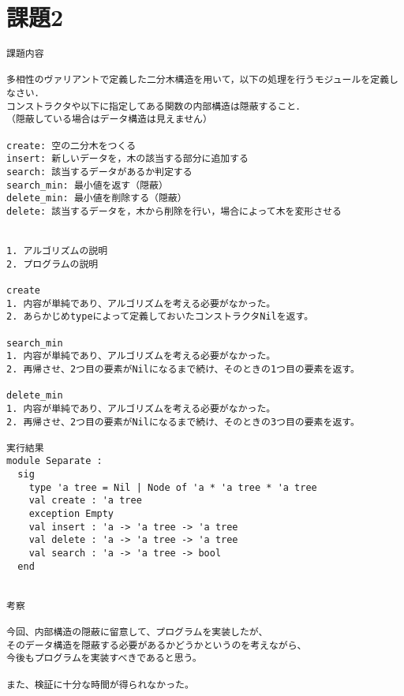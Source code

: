 \documentclass{jarticle}
\begin{document}
\newpage
\section{課題2}
\begin{verbatim}
課題内容

多相性のヴァリアントで定義した二分木構造を用いて，以下の処理を行うモジュールを定義しなさい．
コンストラクタや以下に指定してある関数の内部構造は隠蔽すること．
（隠蔽している場合はデータ構造は見えません）

create: 空の二分木をつくる
insert: 新しいデータを，木の該当する部分に追加する
search: 該当するデータがあるか判定する
search_min: 最小値を返す（隠蔽）
delete_min: 最小値を削除する（隠蔽）
delete: 該当するデータを，木から削除を行い，場合によって木を変形させる


1. アルゴリズムの説明
2. プログラムの説明

create
1. 内容が単純であり、アルゴリズムを考える必要がなかった。
2. あらかじめtypeによって定義しておいたコンストラクタNilを返す。

search_min
1. 内容が単純であり、アルゴリズムを考える必要がなかった。
2. 再帰させ、2つ目の要素がNilになるまで続け、そのときの1つ目の要素を返す。

delete_min
1. 内容が単純であり、アルゴリズムを考える必要がなかった。
2. 再帰させ、2つ目の要素がNilになるまで続け、そのときの3つ目の要素を返す。

実行結果
module Separate :
  sig
    type 'a tree = Nil | Node of 'a * 'a tree * 'a tree
    val create : 'a tree
    exception Empty
    val insert : 'a -> 'a tree -> 'a tree
    val delete : 'a -> 'a tree -> 'a tree
    val search : 'a -> 'a tree -> bool
  end


考察

今回、内部構造の隠蔽に留意して、プログラムを実装したが、
そのデータ構造を隠蔽する必要があるかどうかというのを考えながら、
今後もプログラムを実装すべきであると思う。

また、検証に十分な時間が得られなかった。


\end{verbatim}
\end{document}
